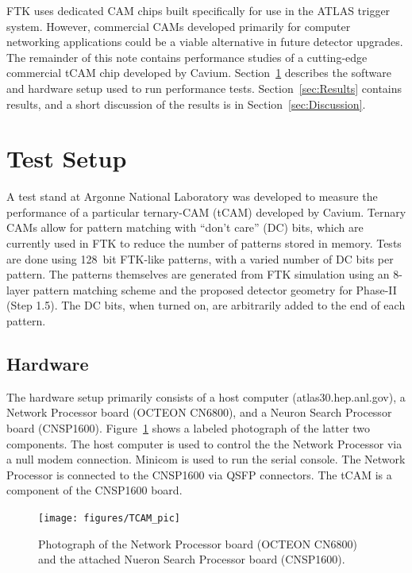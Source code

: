 \documentclass[preprint,prd,showpacs]{revtex4-1}
\begin{document}
FTK uses dedicated CAM chips built specifically for use in the ATLAS trigger system. However, commercial CAMs developed primarily for computer networking applications could be a viable alternative in future detector upgrades. The remainder of this note contains performance studies of a cutting-edge commercial tCAM chip developed by Cavium. Section~\ref{sec:TestSetup} describes the software and hardware setup used to run performance tests. Section~\ref{sec:Results} contains results, and a short discussion of the results is in Section~\ref{sec:Discussion}.

\section{Test Setup}\label{sec:TestSetup}

A test stand at Argonne National Laboratory was developed to measure the performance of a particular ternary-CAM (tCAM) developed by Cavium. Ternary CAMs allow for pattern matching with ``don't care'' (DC) bits, which are currently used in FTK to reduce the number of patterns stored in memory. Tests are done using 128~bit FTK-like patterns, with a varied number of DC bits per pattern. The patterns themselves are generated from FTK simulation using an 8-layer pattern matching scheme and the proposed detector geometry for Phase-II (Step 1.5). The DC bits, when turned on, are arbitrarily added to the end of each pattern.

\subsection{Hardware}

The hardware setup primarily consists of a host computer (atlas30.hep.anl.gov), a Network Processor board (OCTEON CN6800), and a Neuron Search Processor board (CNSP1600). Figure~\ref{fig:board_pic} shows a labeled photograph of the latter two components. The host computer is used to control the the Network Processor via a null modem connection. Minicom is used to run the serial console. The Network Processor is connected to the CNSP1600 via QSFP connectors. The tCAM is a component of the CNSP1600 board.

\begin{figure}[!htb]
\begin{center}
\texttt{[image: figures/TCAM\_pic]}
\caption{Photograph of the Network Processor board (OCTEON CN6800) and the attached Nueron Search Processor board (CNSP1600).}
\label{fig:board_pic}
\end{center}
\end{figure}
\end{document}
